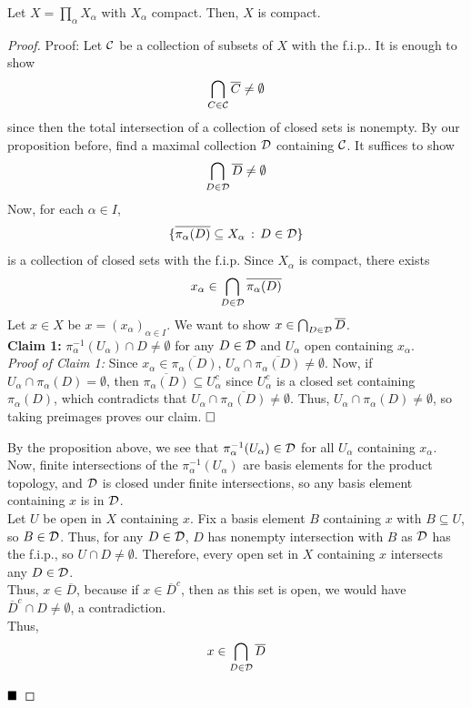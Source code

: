 \begin{theorem}
    Let $X = \prod_{\alpha} X_{\alpha}$ with $X_{\alpha}$ compact. Then, $X$ is compact.
\end{theorem}
\begin{proof}{Proof:}
    Let $\cal{C}$ be a collection of subsets of $X$ with the f.i.p.. It is enough to show
    \[ \bigcap_{C \in \cal{C}} \overline{C} \neq \emptyset \]
    since then the total intersection of a collection of closed sets is nonempty. By our proposition before, find a maximal collection $\cal{D}$ containing $\cal{C}$. It suffices to show
    \[ \bigcap_{D \in \cal{D}} \overline{D} \neq \emptyset \]
    Now, for each $\alpha \in I$,
    \[ \{\overline{\pi_{\alpha}(D)} \subseteq X_{\alpha} \col D \in \cal{D}\} \]
    is a collection of closed sets with the f.i.p. Since $X_{\alpha}$ is compact, there exists
    \[ x_{\alpha} \in \bigcap_{D \in \cal{D}} \overline{\pi_{\alpha}(D)} \]
    Let $x \in X$ be $x = (x_{\alpha})_{\alpha \in I}$. We want to show $x \in \bigcap_{D \in \cal{D}} \overline{D}$.\\

    
    \textbf{Claim 1:} $\pi_{\alpha}^{-1}(U_{\alpha}) \cap D \neq \emptyset$ for any $D \in \cal{D}$ and $U_{\alpha}$ open containing $x_{\alpha}$.\\

    \textit{Proof of Claim 1:} Since $x_{\alpha} \in \overline{\pi_{\alpha}(D)}$, $U_{\alpha} \cap \overline{\pi_{\alpha}(D)} \neq \emptyset$. Now, if $U_{\alpha} \cap \pi_{\alpha}(D) = \emptyset$, then $\overline{\pi_{\alpha}(D)} \subseteq U_{\alpha}^{c}$ since $U_{\alpha}^{c}$ is a closed set containing $\pi_{\alpha}(D)$, which contradicts that $U_{\alpha} \cap \overline{\pi_{\alpha}(D)} \neq \emptyset$. Thus, $U_{\alpha} \cap \pi_{\alpha}(D) \neq \emptyset$, so taking preimages proves our claim. $\miniqed$


    By the proposition above, we see that $\pi_{\alpha}^{-1}(U_{\alpha}) \in \cal{D}$ for all $U_{\alpha}$ containing $x_{\alpha}$. Now, finite intersections of the $\pi_{\alpha}^{-1}(U_{\alpha})$ are basis elements for the product topology, and $\cal{D}$ is closed under finite intersections, so any basis element containing $x$ is in $\cal{D}$.\\


    Let $U$ be open in $X$ containing $x$. Fix a basis element $B$ containing $x$ with $B \subseteq U$, so $B \in \cal{D}$. Thus, for any $D \in \cal{D}$, $D$ has nonempty intersection with $B$ as $\cal{D}$ has the f.i.p., so $U \cap D \neq \emptyset$. Therefore, every open set in $X$ containing $x$ intersects any $D \in \cal{D}$.\\
    
    Thus, $x \in \overline{D}$, because if $x \in \overline{D}^{c}$, then as this set is open, we would have $\overline{D}^{c} \cap D \neq \emptyset$, a contradiction.\\

    Thus,
    \[ x \in \bigcap_{D \in \cal{D}} \overline{D} \]

    $\qed$
\end{proof}


